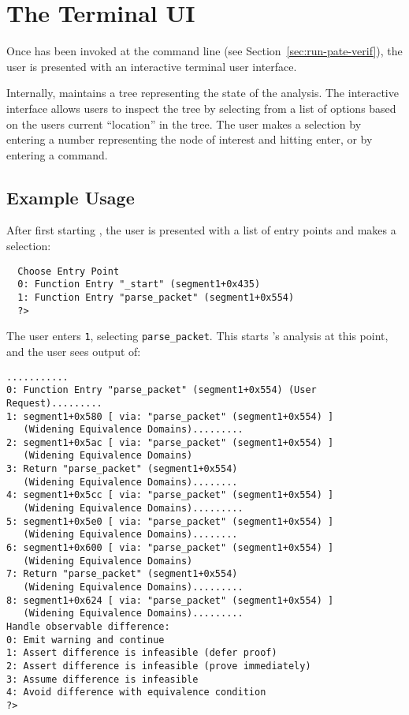 \section{The \pate{} Terminal UI}
\label{sec:terminal-ui}

Once \pate{} has been invoked at the command line (see Section~\ref{sec:run-pate-verif}), the user is presented with an interactive terminal user interface.

Internally, \pate{} maintains a tree representing the state of the analysis.
The interactive interface allows users to inspect the tree by selecting from a list of options based on the users current ``location'' in the tree.
The user makes a selection by entering a number representing the node of interest and hitting enter, or by entering a command.

\subsection{Example Usage}

After first starting \pate{}, the user is presented with a list of entry points and makes a selection:
\begin{verbatim}
  Choose Entry Point
  0: Function Entry "_start" (segment1+0x435)
  1: Function Entry "parse_packet" (segment1+0x554)
  ?>
\end{verbatim}

The user enters \texttt{1}, selecting \texttt{parse\_packet}.
This starts \pate{}'s analysis at this point, and the user sees output of:

\begin{verbatim}
...........
0: Function Entry "parse_packet" (segment1+0x554) (User Request).........
1: segment1+0x580 [ via: "parse_packet" (segment1+0x554) ]
   (Widening Equivalence Domains).........
2: segment1+0x5ac [ via: "parse_packet" (segment1+0x554) ]
   (Widening Equivalence Domains)
3: Return "parse_packet" (segment1+0x554)
   (Widening Equivalence Domains)........
4: segment1+0x5cc [ via: "parse_packet" (segment1+0x554) ]
   (Widening Equivalence Domains).........
5: segment1+0x5e0 [ via: "parse_packet" (segment1+0x554) ]
   (Widening Equivalence Domains)........
6: segment1+0x600 [ via: "parse_packet" (segment1+0x554) ]
   (Widening Equivalence Domains)
7: Return "parse_packet" (segment1+0x554)
   (Widening Equivalence Domains).........
8: segment1+0x624 [ via: "parse_packet" (segment1+0x554) ]
   (Widening Equivalence Domains).........
Handle observable difference:
0: Emit warning and continue
1: Assert difference is infeasible (defer proof)
2: Assert difference is infeasible (prove immediately)
3: Assume difference is infeasible
4: Avoid difference with equivalence condition
?>
\end{verbatim}


